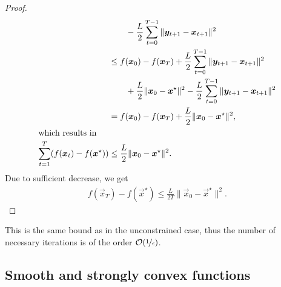 \begin{proof}
\begin{align*}
                                                           & \qquad - \frac{L}{2} \sum_{t=0}^{T-1} \| \vec{y}_{t+1} - \vec{x}_{t+1} \|^2                                             \\
                                                           & \leq f(\vec{x}_0) - f(\vec{x}_T) + \frac{L}{2} \sum_{t=0}^{T-1} \| \vec{y}_{t+1} - \vec{x}_{t+1} \|^2                   \\
                                                           & \qquad + \frac{L}{2} \|\vec{x}_0 - \vec{x}^\star\|^2 - \frac{L}{2} \sum_{t=0}^{T-1} \|\vec{y}_{t+1} - \vec{x}_{t+1}\|^2 \\
                                                           & = f(\vec{x}_0) - f(\vec{x}_T) + \frac{L}{2} \|\vec{x}_0 - \vec{x}^\star\|^2,                                            \\
        \intertext{which results in}
        \sum_{t=1}^{T} (f(\vec{x}_t) - f(\vec{x}^\star))   & \leq \frac{L}{2} \|\vec{x}_0 - \vec{x}^\star\|^2.
    \end{align*}
    Due to sufficient decrease, we get
    \begin{align*}
        f(\vec{x}_T) - f(\vec{x}^\star) \leq \frac{L}{2T} \|\vec{x}_0 - \vec{x}^\star\|^2.
    \end{align*}
\end{proof}

This is the same bound as in the unconstrained case, thus the number of necessary iterations is of
the order $\bigo{\nicefrac{1}{\epsilon}}$.

\subsection{Smooth and strongly convex functions}

